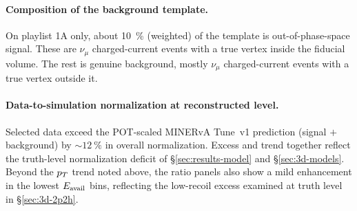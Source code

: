 \paragraph{Composition of the background template.} On playlist 1A only, about \SI{10}{\percent} (weighted) of the template is out-of-phase-space signal. These are $\nu_{\mu}$ charged-current events with a true vertex inside the fiducial volume. The rest is genuine background, mostly $\nu_{\mu}$ charged-current events with a true vertex outside it.

\paragraph{Data-to-simulation normalization at reconstructed level.} Selected data exceed the POT-scaled MINERvA Tune~v1 prediction (signal $+$ background) by $\sim\SI{12}{\percent}$ in overall normalization. Excess and trend together reflect the truth-level normalization deficit of \S\ref{sec:results-model} and \S\ref{sec:3d-models}. Beyond the $p_{T}$ trend noted above, the ratio panels also show a mild enhancement in the lowest $E_{\mathrm{avail}}$ bins, reflecting the low-recoil excess examined at truth level in \S\ref{sec:3d-2p2h}.

